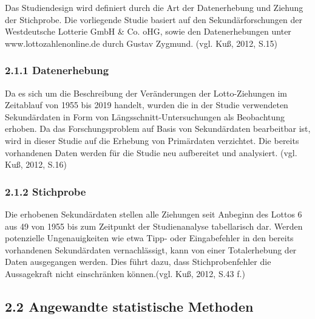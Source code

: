 \documentclass[ngerman,]{article}
\begin{document}
Das Studiendesign wird definiert durch die Art der Datenerhebung und
Ziehung der Stichprobe. Die vorliegende Studie basiert auf den
Sekundärforschungen der Westdeutsche Lotterie GmbH \& Co. oHG, sowie den
Datenerhebungen unter www.lottozahlenonline.de durch Gustav Zygmund.
(vgl. Kuß, 2012, S.15)

\subsubsection{2.1.1 Datenerhebung}\label{datenerhebung}

Da es sich um die Beschreibung der Veränderungen der Lotto-Ziehungen im
Zeitablauf von 1955 bis 2019 handelt, wurden die in der Studie
verwendeten Sekundärdaten in Form von Längsschnitt-Untersuchungen als
Beobachtung erhoben. Da das Forschungsproblem auf Basis von
Sekundärdaten bearbeitbar ist, wird in dieser Studie auf die Erhebung
von Primärdaten verzichtet. Die bereits vorhandenen Daten werden für die
Studie neu aufbereitet und analysiert. (vgl. Kuß, 2012, S.16)

\subsubsection{2.1.2 Stichprobe}\label{stichprobe}

Die erhobenen Sekundärdaten stellen alle Ziehungen seit Anbeginn des
Lottos 6 aus 49 von 1955 bis zum Zeitpunkt der Studienanalyse
tabellarisch dar. Werden potenzielle Ungenauigkeiten wie etwa Tipp- oder
Eingabefehler in den bereits vorhandenen Sekundärdaten vernachlässigt,
kann von einer Totalerhebung der Daten ausgegangen werden. Dies führt
dazu, dass Stichprobenfehler die Aussagekraft nicht einschränken
können.(vgl. Kuß, 2012, S.43 f.)

\subsection{2.2 Angewandte statistische
Methoden}\label{angewandte-statistische-methoden}
\end{document}
